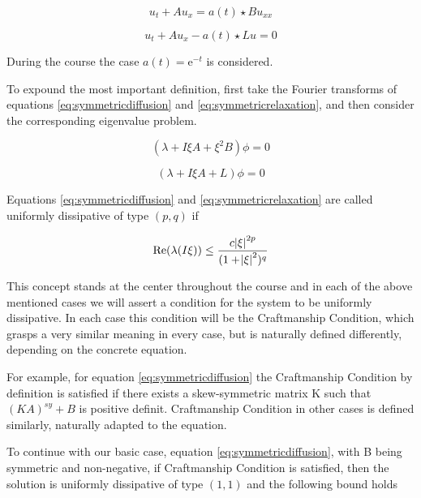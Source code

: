 \documentclass{article}
\begin{document}
\begin{equation} \label{eq:symmetricdiffusionmemo}
u_{t} + Au_{x} = a(t) \star Bu_{xx}
\end{equation}

\begin{equation} \label{eq:symmetricrelaxationmemo}
u_{t} + Au_{x} -a(t) \star Lu = 0
\end{equation}

During the course the case $a(t) = \mathrm{e}^{-t}$ is considered.

To expound the most important definition, first take the Fourier transforms of equations \ref{eq:symmetricdiffusion} and \ref{eq:symmetricrelaxation}, and then consider the corresponding eigenvalue problem.

\begin{equation} \label{eq:symmetricdiffusioneigenv}
( \lambda + I \xi A + \xi ^2 B ) \phi = 0
\end{equation}

\begin{equation} \label{eq:symmetricrelaxationeigenv}
( \lambda + I \xi A + L ) \phi = 0
\end{equation}

Equations \ref{eq:symmetricdiffusion} and \ref{eq:symmetricrelaxation} are called uniformly dissipative of type $(p,q)$ if

\begin{equation} \label{eq:uniformdissipativity}
\operatorname{Re}(\lambda(I \xi)) \leq \frac{c\abs{\xi}^{2p}}{(1 + \abs{\xi}^2)^q}
\end{equation}

This concept stands at the center throughout the course and in each of the above mentioned cases we will assert a condition for the system to be uniformly dissipative. In each case this condition will be the Craftmanship Condition, which grasps a very similar meaning in every case, but is naturally defined differently, depending on the concrete equation.

For example, for equation \ref{eq:symmetricdiffusion} the Craftmanship Condition by definition is satisfied if there exists a skew-symmetric matrix K such that $ {(KA)}^{sy} + B$ is positive definit. Craftmanship Condition in other cases is defined similarly, naturally adapted to the equation.

To continue with our basic case, equation \ref{eq:symmetricdiffusion}, with B being symmetric and non-negative, if Craftmanship Condition is satisfied, then the solution is uniformly dissipative of type $(1,1)$ and the following bound holds
\end{document}
